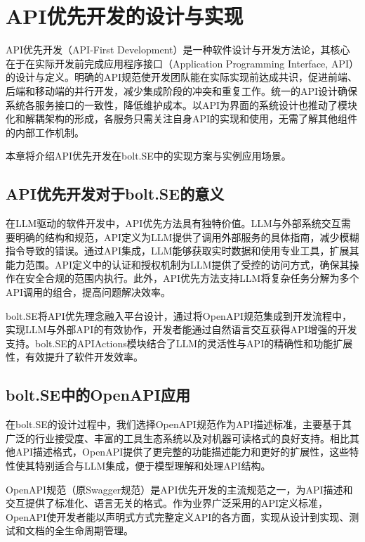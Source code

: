 
\chapter{API优先开发的设计与实现}
\label{chap:api-first}

API优先开发（API-First Development）是一种软件设计与开发方法论，其核心在于在实际开发前完成应用程序接口（Application Programming Interface, API）的设计与定义。明确的API规范使开发团队能在实际实现前达成共识，促进前端、后端和移动端的并行开发，减少集成阶段的冲突和重复工作。统一的API设计确保系统各服务接口的一致性，降低维护成本。以API为界面的系统设计也推动了模块化和解耦架构的形成，各服务只需关注自身API的实现和使用，无需了解其他组件的内部工作机制。

本章将介绍API优先开发在bolt.SE中的实现方案与实例应用场景。

\section{API优先开发对于bolt.SE的意义}

在LLM驱动的软件开发中，API优先方法具有独特价值。LLM与外部系统交互需要明确的结构和规范，API定义为LLM提供了调用外部服务的具体指南，减少模糊指令导致的错误。通过API集成，LLM能够获取实时数据和使用专业工具，扩展其能力范围。API定义中的认证和授权机制为LLM提供了受控的访问方式，确保其操作在安全合规的范围内执行。此外，API优先方法支持LLM将复杂任务分解为多个API调用的组合，提高问题解决效率。

bolt.SE将API优先理念融入平台设计，通过将OpenAPI规范集成到开发流程中，实现LLM与外部API的有效协作，开发者能通过自然语言交互获得API增强的开发支持。bolt.SE的APIActions模块结合了LLM的灵活性与API的精确性和功能扩展性，有效提升了软件开发效率。

\section{bolt.SE中的OpenAPI应用}

在bolt.SE的设计过程中，我们选择OpenAPI规范作为API描述标准，主要基于其广泛的行业接受度、丰富的工具生态系统以及对机器可读格式的良好支持。相比其他API描述格式，OpenAPI提供了更完整的功能描述能力和更好的扩展性，这些特性使其特别适合与LLM集成，便于模型理解和处理API结构。

OpenAPI规范（原Swagger规范）是API优先开发的主流规范之一，为API描述和交互提供了标准化、语言无关的格式\cite{openapi2023}。作为业界广泛采用的API定义标准，OpenAPI使开发者能以声明式方式完整定义API的各方面，实现从设计到实现、测试和文档的全生命周期管理。

